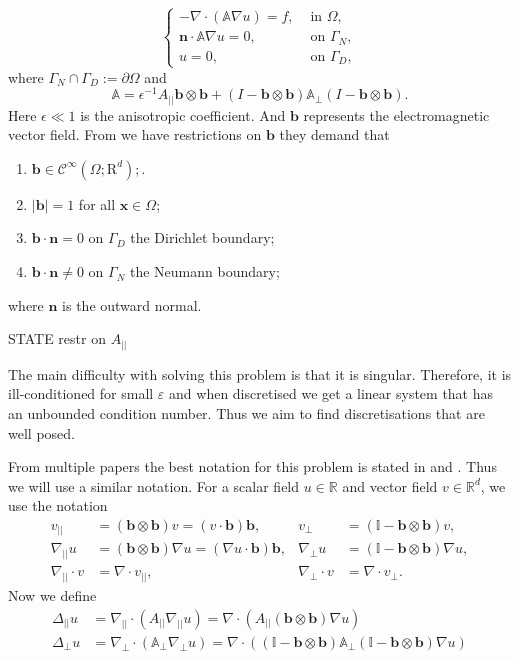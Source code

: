 \documentclass[12pt]{ociamthesis}
\begin{document}
\begin{equation} \label{PDE}
\begin{cases}
-\nabla \cdot (\mathbb{A}\nabla u) = f, & \text{ in }\Omega,\\
\mathbf{n}\cdot \mathbb{A}\nabla u = 0, & \text{ on }\Gamma_N, \\
u = 0, & \text{  on }\Gamma_D,
\end{cases}
\end{equation}
where $\Gamma_N \cap \Gamma_D := \partial \Omega$ and
\begin{equation} \label{Mat_A}
\mathbb{A} = \epsilon^{-1} A_{||}\mathbf{b}\otimes \mathbf{b}
+(I - \mathbf{b}\otimes \mathbf{b})\mathbb{A}_{\perp}
(I - \mathbf{b}\otimes \mathbf{b}).
\end{equation}
    Here $\epsilon \ll 1$ is the anisotropic coefficient. And $\mathbf{b}$ represents the electromagnetic vector field. From \cite{DN} we have restrictions on $\mathbf{b}$ they demand that
    \begin{enumerate}
  \item $\mathbf{b} \in \mathcal{C}^{\infty}(\Omega; \mathrm{R}^d);$.
  \item $|\mathbf{b}|=1$ for all $\mathbf{x} \in \Omega$;
  \item $\mathbf{b}\cdot \mathbf{n} = 0$ on $\Gamma_D$ the Dirichlet boundary;
  \item $\mathbf{b}\cdot \mathbf{n} \neq 0$ on $\Gamma_N$ the Neumann boundary;
\end{enumerate}
where $\mathbf{n}$ is the outward normal.

STATE restr on $A_{||}$

The main difficulty with solving this problem is that it is singular. Therefore, it is ill-conditioned for small $\varepsilon$ and when discretised we get a linear system that has an unbounded condition number. Thus we aim to find discretisations that are well posed.  

From multiple papers the best notation for this problem is stated in \cite{DN} and \cite{AP}. Thus we will use a similar notation. For a scalar field $u\in\mathbb{R}$ and vector field $v \in \mathbb{R}^d$, we use the notation
\begin{align}
v_{||} &=(\mathbf{b} \otimes \mathbf{b})v = (v \cdot \mathbf{b})\mathbf{b}
, & v_{\perp} &= (\mathbb{I}-\mathbf{b} \otimes \mathbf{b})v,\\
\nabla_{||}u &= (\mathbf{b} \otimes \mathbf{b}) \nabla u = (\nabla u \cdot \mathbf{b})\mathbf{b},
& \nabla_{\perp} u &= (\mathbb{I}-\mathbf{b} \otimes \mathbf{b}) \nabla u,\\
\nabla_{||} \cdot v &= \nabla \cdot v_{||},
& \nabla_{\perp} \cdot v &= \nabla \cdot v_{\perp}.
\end{align}
Now we define 
\begin{align} \label{Lap_para}
\Delta_{||}u &= \nabla_{||}\cdot(A_{||}\nabla_{||}u)  =
\nabla \cdot(A_{||} (\mathbf{b} \otimes \mathbf{b}) \nabla u)\\ \label{Lap_perp}
\Delta_{\perp}u  &= \nabla_{\perp}\cdot(\mathbb{A}_{\perp}\nabla_{\perp}u)  = 
\nabla \cdot((\mathbb{I}-\mathbf{b} \otimes \mathbf{b})\mathbb{A}_{\perp}(\mathbb{I}-\mathbf{b} \otimes \mathbf{b})\nabla u)
\end{align}
\end{document}
